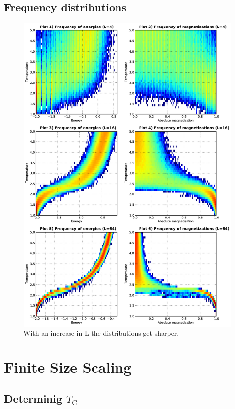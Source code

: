 \documentclass[12pt,a4paper]{scrartcl}
\begin{document}
\subsection{Frequency distributions}
\begin{figure}[H]
\includegraphics[width=13.0cm]{../plots/1window_01.pdf}
\caption{With an increase in L the distributions get sharper.}
\end{figure}


\section{Finite Size Scaling}

\subsection{Determinig $T_\text{C}$}
\end{document}
